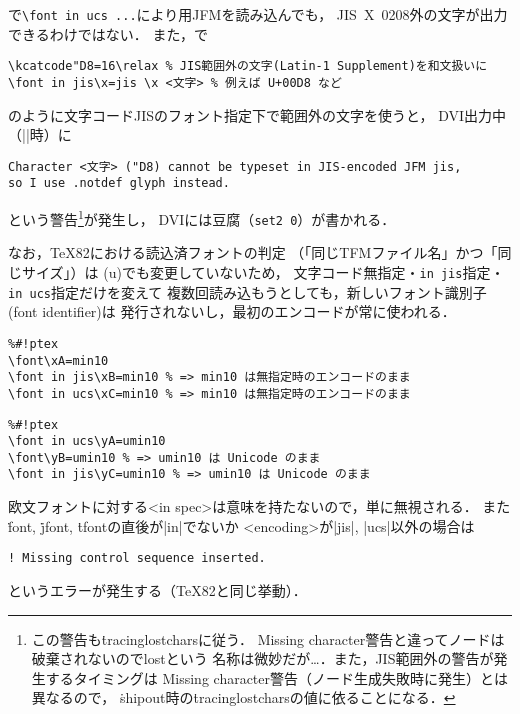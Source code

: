 \documentclass[a4paper,11pt,nomag,dvipdfmx]{jsarticle}
\begin{document}
\begin{dangerous}
  \pTeX で\verb|\font in ucs ...|により\upTeX 用JFMを読み込んでも，
  JIS~X~0208外の文字が出力できるわけではない．
  また，\upTeX で
\begin{verbatim}
\kcatcode"D8=16\relax % JIS範囲外の文字(Latin-1 Supplement)を和文扱いに
\font in jis\x=jis \x <文字> % 例えば U+00D8 など
\end{verbatim}
  のように文字コードJISのフォント指定下で範囲外の文字を使うと，
  DVI出力中（|\shipout|時）に
\begin{verbatim}
Character <文字> ("D8) cannot be typeset in JIS-encoded JFM jis,
so I use .notdef glyph instead.
\end{verbatim}
  という警告\footnote{この警告も\.{tracinglostchars}に従う．
  Missing character警告と違ってノードは破棄されないのでlostという
  名称は微妙だが…．また，JIS範囲外の警告が発生するタイミングは
  Missing character警告（ノード生成失敗時に発生）とは異なるので，
  \.{shipout}時の\.{tracinglostchars}の値に依ることになる．}が発生し，
  DVIには豆腐（\verb+set2 0+）が書かれる．
\end{dangerous}

\begin{dangerous}
  なお，\TeX82における読込済フォントの判定
  （「同じTFMファイル名」かつ「同じサイズ」）は
  (u)\pTeX でも変更していないため，
  文字コード無指定・\verb+in jis+指定・\verb+in ucs+指定だけを変えて
  複数回読み込もうとしても，新しいフォント識別子(font identifier)は
  発行されないし，最初のエンコードが常に使われる．
\begin{verbatim}
%#!ptex
\font\xA=min10
\font in jis\xB=min10 % => min10 は無指定時のエンコードのまま
\font in ucs\xC=min10 % => min10 は無指定時のエンコードのまま
\end{verbatim}
\begin{verbatim}
%#!ptex
\font in ucs\yA=umin10
\font\yB=umin10 % => umin10 は Unicode のまま
\font in jis\yC=umin10 % => umin10 は Unicode のまま
\end{verbatim}
\end{dangerous}

\begin{dangerous}
  欧文フォントに対する<in spec>は意味を持たないので，単に無視される．
  また\.{font}, \.{jfont}, \.{tfont}の直後が|in|でないか
  <encoding>が|jis|, |ucs|以外の場合は
\begin{verbatim}
! Missing control sequence inserted.
\end{verbatim}
  というエラーが発生する（\TeX82と同じ挙動）．
\end{dangerous}
\end{document}
